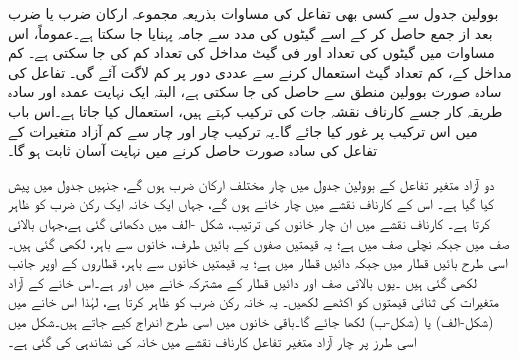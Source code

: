 بوولین جدول سے کسی بھی تفاعل کی مساوات بذریعہ مجموعہ ارکان ضرب یا  ضرب بعد از جمع حاصل کر کے اسے گیٹوں کی مدد سے جامہ پہنایا جا سکتا ہے۔عموماً، اس مساوات میں گیٹوں کی تعداد اور فی گیٹ مداخل کی تعداد کم کی جا سکتی ہے۔ کم مداخل کے، کم تعداد گیٹ استعمال کرنے سے عددی دور پر کم لاگت آئے گی۔ تفاعل کی سادہ صورت بوولین منطق سے حاصل کی جا سکتی ہے، البتہ ایک نہایت عمدہ اور سادہ طریقہ کار جسے کارناف نقشہ جات کی ترکیب کہتے ہیں، استعمال کیا جاتا ہے۔اس باب میں اس ترکیب پر غور کیا جائے گا۔یہ ترکیب چار اور چار سے کم آزاد متغیرات کے تفاعل کی سادہ صورت حاصل کرنے میں نہایت آسان ثابت ہو گا۔

دو آزاد متغیر تفاعل  کے بوولین جدول میں چار مختلف ارکان ضرب ہوں گے، جنہیں جدول  میں پیش کیا گیا ہے۔ اس کے کارناف نقشے میں چار خانے ہوں گے، جہاں ایک خانہ ایک رکن ضرب کو ظاہر کرتا ہے۔ کارناف نقشے میں ان چار خانوں کی ترتیب، شکل -الف میں دکھائی گئی ہے،جہاں بالائی صف میں  جبکہ نچلی صف میں  ہے؛ یہ قیمتیں صفوں کے بائیں طرف، خانوں سے باہر، لکھی گئی ہیں۔اسی طرح بائیں قطار میں جبکہ دائیں قطار میں ہے؛ یہ قیمتیں خانوں سے باہر، قطاروں کے اوپر جانب لکھی گئی ہیں ۔یوں بالائی صف اور دائیں قطار کے مشترکہ خانے میں  اور  ہے۔اس خانے کے آزاد متغیرات کی ثنائی قیمتوں کو اکٹھے  لکھیں۔ یہ خانہ رکن ضرب  کو ظاہر کرتا ہے، لہٰذا اس خانے میں  (شکل-الف) یا  (شکل-ب) لکھا جائے گا۔باقی خانوں میں اسی طرح اندراج کیے جاتے ہیں۔شکل  میں اسی طرز پر چار آزاد متغیر تفاعل کارناف نقشے میں خانہ  کی نشاندہی کی گئی ہے۔

